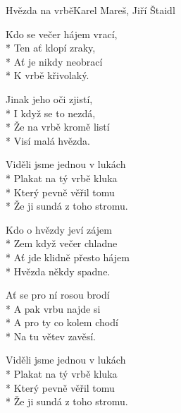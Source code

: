 \documentclass[10.5pt]{book}
\begin{document}
\begin{poem}{Hvězda na vrbě}{Karel Mareš, Jiří Štaidl}

\settowidth{\versewidth}{Viděli jsme jednou v lukách}

Kdo se večer hájem vrací,\\*
Ten ať klopí zraky,\\*
Ať je nikdy neobrací\\*
K vrbě křivolaký.

Jinak jeho oči zjistí,\\*
I když se to nezdá,\\*
Že na vrbě kromě listí\\*
Visí malá hvězda.

Viděli jsme jednou v lukách\\*
Plakat na tý vrbě kluka\\*
Který pevně věřil tomu\\*
Že ji sundá z toho stromu.

Kdo o hvězdy jeví zájem\\*
Zem když večer chladne\\*
Ať jde klidně přesto hájem\\*
Hvězda někdy spadne.

Ať se pro ní rosou brodí\\*
A pak vrbu najde si\\*
A pro ty co kolem chodí\\*
Na tu větev zavěsí.

Viděli jsme jednou v lukách\\*
Plakat na tý vrbě kluka\\*
Který pevně věřil tomu\\*
Že ji sundá z toho stromu.

\end{poem}
\end{document}
